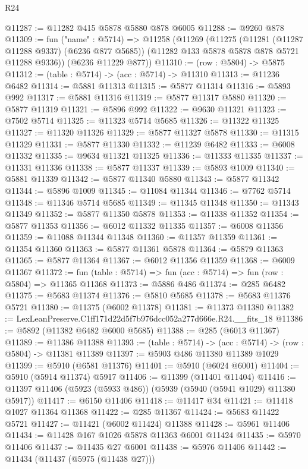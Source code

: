 \begin{lexlean}{R24}
\begin{coremodule}
@11287 := @11282 @415 @5878 @5880 @878 @6005
@11288 := @9260 @878
@11309 := fun ("name" : @5714) =>
  @11258
    (@11269
      (@11275
        (@11281 (@11287 @11288 @9337) (@6236 @877 @5685))
        (@11282 @133 @5878 @5878 @878 @5721 @11288 @9336))
      (@6236 @11229 @877))
@11310 := (row : @5804) -> @5875
@11312 := (table : @5714) -> (acc : @5714) -> @11310
@11313 := @11236 @6482
@11314 := @5881 @11313
@11315 := @5877 @11314
@11316 := @5893 @992
@11317 := @5881 @11316
@11319 := @5877 @11317 @5880
@11320 := @5877 @11319
@11321 := @5896 @992
@11322 := @9630 @11321
@11323 := @7502 @5714
@11325 := @11323 @5714 @5685
@11326 := @11322 @11325
@11327 := @11320 @11326
@11329 := @5877 @11327 @5878
@11330 := @11315 @11329
@11331 := @5877 @11330
@11332 := @11239 @6482
@11333 := @6008 @11332
@11335 := @9634 @11321 @11325
@11336 := @11333 @11335
@11337 := @11331 @11336
@11338 := @5877 @11337
@11339 := @5893 @1009
@11340 := @5881 @11339
@11342 := @5877 @11340 @5880
@11343 := @5877 @11342
@11344 := @5896 @1009
@11345 := @11084 @11344
@11346 := @7762 @5714
@11348 := @11346 @5714 @5685
@11349 := @11345 @11348
@11350 := @11343 @11349
@11352 := @5877 @11350 @5878
@11353 := @11338 @11352
@11354 := @5877 @11353
@11356 := @6012 @11332 @11335
@11357 := @6008 @11356
@11359 := @11088 @11344 @11348
@11360 := @11357 @11359
@11361 := @11354 @11360
@11363 := @5877 @11361 @5878
@11364 := @5879 @11363
@11365 := @5877 @11364
@11367 := @6012 @11356 @11359
@11368 := @6009 @11367
@11372 := fun (table : @5714) => fun (acc : @5714) => fun (row : @5804) => @11365 @11368
@11373 := @5886 @486
@11374 := @285 @6482
@11375 := @5683 @11374
@11376 := @5810 @5685
@11378 := @5683 @11376 @5721
@11380 := @11375 (@6002 @11378)
@11381 := @11373 @11380
@11382 := LexLeanPreserve.C1ff171d22d5f7b976dcc052a277d666e.R24.__fits_18
@11386 := @5892 (@11382 @6482 @6000 @5685)
@11388 := @285 (@6013 @11367)
@11389 := @11386 @11388
@11393 := (table : @5714) -> (acc : @5714) -> (row : @5804) -> @11381 @11389
@11397 := @5903 @486 @11380 @11389 @1029
@11399 := @5910 (@6581 @11376)
@11401 := @5910 (@6024 @6001)
@11404 := @5910 (@5914 @11374) @5917
@11406 := @11399 (@11401 @11404)
@11416 := @11397 @11406 (@5923 (@5933 @486)) (@5939 (@5940 (@5941 @1029) @11380 @5917))
@11417 := @6150 @11406
@11418 := @11417 @34
@11421 := @11418 @1027 @11364 @11368
@11422 := @285 @11367
@11424 := @5683 @11422 @5721
@11427 := @11421 (@6002 @11424) @11388
@11428 := @5961 @11406
@11434 := @11428 @167 @1026 @5878 @11363 @6001 @11424
@11435 := @5970 @11406
@11437 := @11435 @27 @6001
@11438 := @5976 @11406
@11442 := @11434 (@11437 (@5975 (@11438 @27)))

\end{coremodule}
\end{lexlean}
